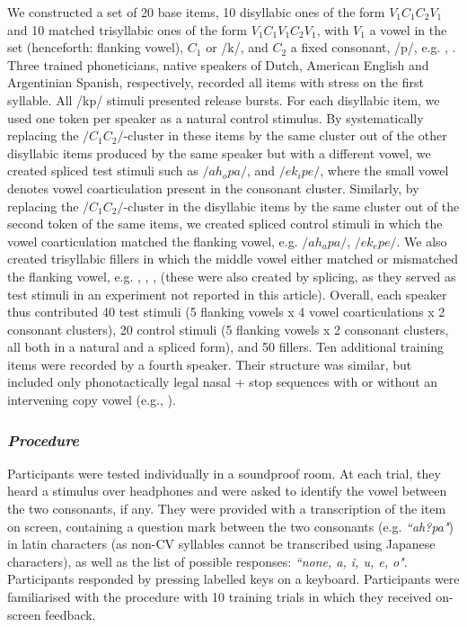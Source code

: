 We constructed a set of 20 base items, 10 disyllabic ones of the form $V_{1}C_{1}C_{2}V_{1}$ and 10 matched trisyllabic ones of the form $V_{1}C_{1}V_{1}C_{2}V_{1}$, 
with $V_{1}$ a vowel in the set  (henceforth: flanking vowel), $C_{1}$  or /k/, and $C_{2}$ a fixed consonant, /p/, e.g. , . Three trained phoneticians, native speakers of Dutch, American English and Argentinian Spanish, respectively, recorded all items with stress on the first syllable. All /kp/ stimuli presented release bursts. For each disyllabic item, we used one token per speaker as a natural control stimulus. By systematically replacing the $/C_{1}C_{2}/$-cluster in these items by the same cluster out of the other disyllabic items produced by the same speaker but with a different vowel, we created spliced test stimuli such as $/ah_{o}pa/$, and $/ek_{i}pe/$, where the small vowel denotes vowel coarticulation present in the consonant cluster. Similarly, by replacing the $/C_{1}C_{2}/$-cluster in the disyllabic items by the same cluster out of the second token of the same items, we created spliced control stimuli in which the vowel coarticulation matched the flanking vowel, e.g. $/ah_{a}pa/$, $/ek_{e}pe/$. We also created trisyllabic fillers in which the middle vowel either matched or mismatched the flanking vowel, e.g. , , ,  (these were also created by splicing, as they served as test stimuli in an experiment not reported in this article). Overall, each speaker thus contributed 40 test stimuli (5 flanking vowels x 4 vowel coarticulations x 2 consonant clusters), 20 control stimuli (5 flanking vowels x 2 consonant clusters, all both in a natural and a spliced form), and 50 fillers. Ten additional training items were recorded by a fourth speaker. Their structure was similar, but included only phonotactically legal nasal + stop sequences with or without an intervening copy vowel (e.g., ). 

\subsubsection{\textit{Procedure}}

Participants were tested individually in a soundproof room. At each trial, they heard a stimulus over headphones and were asked to identify the vowel between the two consonants, if any. They were provided with a transcription of the item on screen, containing a question mark between the two consonants (e.g. \textit{``ah?pa"}) in latin characters (as non-CV syllables cannot be transcribed using Japanese characters), as well as the list of possible responses: \textit{``none, a, i, u, e, o"}. Participants responded by pressing labelled keys on a keyboard. Participants were familiarised with the procedure with 10 training trials in which they received on-screen feedback. 

